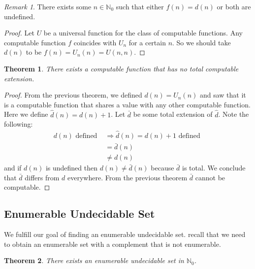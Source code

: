 \documentclass[10pt, letterpaper]{article}
\newcommand{\N}{\mathbb{N}}
\newtheorem{thm}{Theorem}
\theoremstyle{remark}
\newtheorem{rem}{Remark}
\theoremstyle{definition}
\begin{document}
    \begin{rem}
        There exists some $n \in \N_0$ such that either $f(n) = d(n)$ or both are undefined.
    \end{rem}

    \begin{proof}
        Let $U$ be a universal function for the class of computable functions. Any computable function $f$ coincides 
        with $U_n$ for a certain $n$. So we should take $d(n)$ to be $f(n) = U_n(n) = U(n,n)$.
    \end{proof}

    \begin{thm}
        There exists a computable function that has no total computable extension.
    \end{thm}

    \begin{proof}
        From the previous theorem, we defined $d(n) = U_n(n)$ and saw that it is a computable function that shares a value 
        with any other computable function. Here we define $\hat{d}(n) = d(n) + 1$. Let $\bar{d}$ be some total extension of $\hat{d}$.
        Note the following:
        \begin{align*}
            d(n) \text{ defined } & \Rightarrow \hat{d}(n) = d(n)+1 \text{ defined } \\
                                  & = \bar{d}(n) \\
                                  & \neq d(n)
        \end{align*}
        and if $d(n)$ is undefined then $d(n) \neq \bar{d}(n)$ because $\bar{d}$ is total. We conclude that $\bar{d}$ differs 
        from $d$ everywhere. From the previous theorem $\bar{d}$ cannot be computable.
    \end{proof}

    \subsection*{Enumerable Undecidable Set}

    We fulfill our goal of finding an enumerable undecidable set. recall that we need to obtain an enumerable set 
    with a complement that is not enumerable.

    \begin{thm}
        There exists an enumerable undecidable set in $\N_0$.
    \end{thm}
\end{document}

